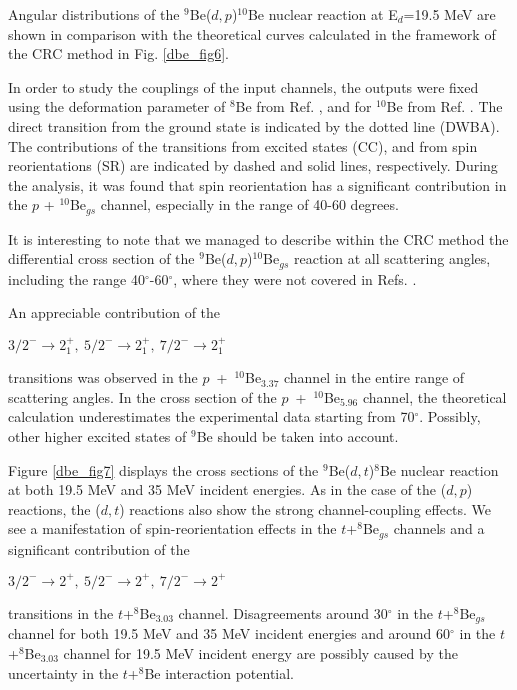\documentclass[
12pt, %
oneside, %
english, %
onehalfspacing, %
onehalfspacing, %
headsepline, %
]{MastersDoctoralThesis} %
\begin{document}
Angular distributions of the ${}^9$Be($d,p$)${}^{10}$Be nuclear reaction at E$_d$=19.5 MeV are shown in comparison with the theoretical curves  calculated in the framework of the CRC method in Fig. \ref{dbe_fig6}.

In order to study the couplings of the input  channels, the outputs  were fixed using the deformation parameter of $^8$Be from Ref. \cite{rocca2018}, and for $^{10}$Be from Ref. \cite{harakeh1980strong}. 
The direct transition from the ground state is indicated by the dotted line (DWBA). 
The contributions of the transitions from excited states (CC), and from spin reorientations (SR) are indicated by dashed and solid lines, respectively.
During the analysis, it was found that spin reorientation has a significant contribution in the $p$ + $^{10}$Be$_{gs}$ channel, especially in the range of 40-60 degrees. 

It is interesting to note that we managed to describe within the CRC method the differential cross section of the ${}^9$Be($d,p$)${}^{10}$Be$_{gs}$ reaction at all scattering angles, including the range 40$^\circ$-60$^\circ$, where they were not covered in Refs. \cite{galanina2012, bodek1989}.
 
An appreciable contribution of the \begin{small}
$3/2^- \rightarrow 2^+_1,~5/2^- \rightarrow 2^+_1,~7/2^-\rightarrow 2^+_1$
\end{small} transitions was observed in the $p$~+~$^{10}$Be$_{3.37}$ channel in the entire range of scattering angles. 
In the cross section of the  $p$~+~$^{10}$Be$_{5.96}$ channel, the theoretical calculation underestimates the experimental data starting from 70$^\circ$. Possibly, other higher excited states of $^9$Be should be taken into account.

Figure \ref{dbe_fig7} displays the cross sections of the ${}^9$Be($d,t$)${}^{8}$Be nuclear reaction at both 19.5 MeV and 35 MeV incident energies. As in the case of the ($d,p$) reactions, the ($d,t$) reactions also show the strong channel-coupling effects. We see a manifestation of spin-reorientation effects in the $t$+$^8$Be$_{gs}$ channels and a significant contribution of the  \begin{small}
$3/2^- \rightarrow 2^+,~ 5/2^- \rightarrow 2^+,~ 7/2^-\rightarrow 2^+$
\end{small} transitions in the $t$+$^8$Be$_{3.03}$ channel.
Disagreements around 30$^\circ$ in the $t$+$^8$Be$_{gs}$ channel for both 19.5 MeV and 35 MeV incident energies and around 60$^\circ$ in the $t$+$^8$Be$_{3.03}$ channel for 19.5 MeV incident energy are possibly caused by the uncertainty in the $t$+$^8$Be interaction potential.
\end{document}
